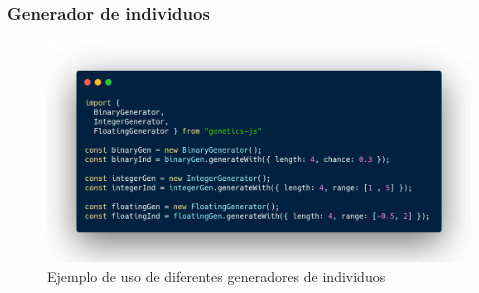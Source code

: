 \documentclass{beamer}
\begin{document}
\begin{frame}
\frametitle{Generador de individuos}

\begin{figure}
    \centering
    \includegraphics[scale=0.21]{pres/img/desarrollo/generator-example.png}
    \caption{Ejemplo de uso de diferentes generadores de individuos}
    \label{fig:my_label}
\end{figure}

\end{frame}
\end{document}
